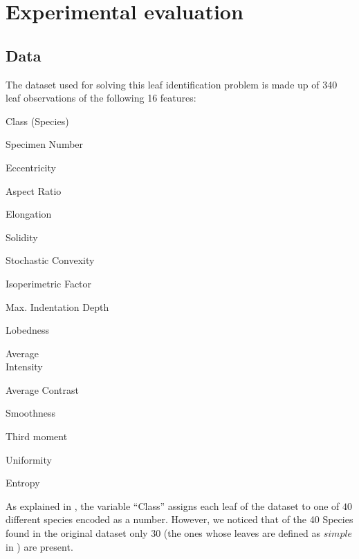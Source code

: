 \documentclass{article}
\begin{document}
\section{Experimental evaluation}

\subsection{Data}\label{dat}
The dataset used for solving this leaf identification problem is made up of 340 leaf observations of the following 16 features:
\begin{multicols}{4}
	\begin{enumerate}
		
		\footnotesize{\item Class (Species)}
		\footnotesize{\item Specimen Number}
		\footnotesize{\item Eccentricity}
		\footnotesize{\item Aspect Ratio}
		
		\columnbreak
		
		\footnotesize{\item Elongation}
		\footnotesize{\item Solidity}
		\footnotesize {\item Stochastic Convexity}
		\footnotesize{\item Isoperimetric Factor}
		
		\columnbreak
		
		\footnotesize{\item Max. Indentation Depth}
		\footnotesize{\item Lobedness}
		\footnotesize{\item Average\\ Intensity}
		\footnotesize{\item Average Contrast}
		
		\columnbreak
		
		\footnotesize{\item Smoothness}
		\footnotesize{\item Third moment}
		\footnotesize{\item Uniformity}
		\footnotesize{\item Entropy}
	\end{enumerate}
\end{multicols}
\noindent As explained in \cite{silva}, the variable “Class”  assigns each leaf of the dataset to one of $40$ different species encoded as a number. However, we noticed that  of the 40 Species found in the original dataset only 30 (the ones whose leaves are defined as $\textit{simple}$ in \cite{silva}) are present.
\end{document}
